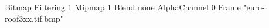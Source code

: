 {Bitmap
	{Filtering 1}
	{Mipmap 1}
	{Blend none}
	{AlphaChannel 0}
	{Frame "euro-roof3xx.tif.bmp"}
}
